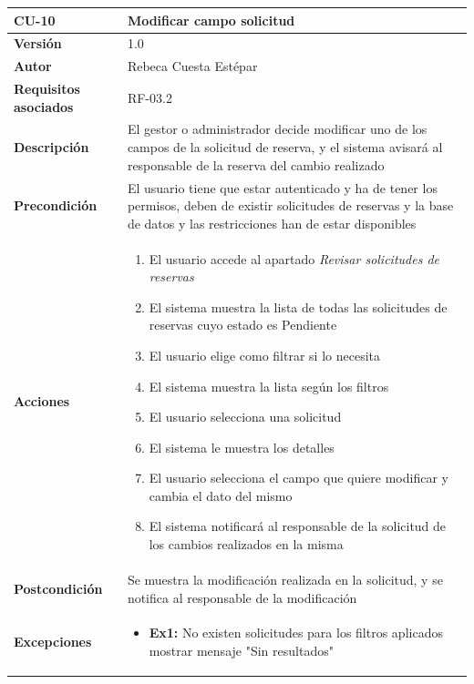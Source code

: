 \begin{table}[p]
	\centering
	\begin{tabularx}{\linewidth}{ p{} p{} }
		\toprule
		\textbf{CU-10}    & \textbf{Modificar campo solicitud}\\
		\toprule
		\textbf{Versión}              & 1.0    \\
		\textbf{Autor}                & Rebeca Cuesta Estépar \\
		\textbf{Requisitos asociados} & RF-03.2 \\
		\textbf{Descripción}          & El gestor o administrador decide modificar uno de los campos de la solicitud de reserva, y el sistema avisará al responsable de la reserva del cambio realizado \\
		\textbf{Precondición}         & El usuario tiene que estar autenticado y ha de tener los permisos, deben de existir solicitudes de reservas y la base de datos y las restricciones han de estar disponibles \\
		\textbf{Acciones}             &
		\begin{enumerate}
			\def\labelenumi{\arabic{enumi}.}
			\tightlist
			\item El usuario accede al apartado \emph{Revisar solicitudes de reservas}
			\item El sistema muestra la lista de todas las solicitudes de reservas cuyo estado es Pendiente
			\item El usuario elige como filtrar si lo necesita
			\item El sistema muestra la lista según los filtros
			\item El usuario selecciona una solicitud
			\item El sistema le muestra los detalles
			\item El usuario selecciona el campo que quiere modificar y cambia el dato del mismo
			\item El sistema notificará al responsable de la solicitud de los cambios realizados en la misma
		\end{enumerate}\\
		\textbf{Postcondición} & Se muestra la modificación realizada en la solicitud, y se notifica al responsable de la modificación \\
		\textbf{Excepciones}          &  
		\begin{itemize}
			\tightlist
			\item \textbf{Ex1:} No existen solicitudes para los filtros aplicados \textrightarrow{} mostrar mensaje "Sin resultados"

\end{itemize}
\end{tabularx}
\end{table}

